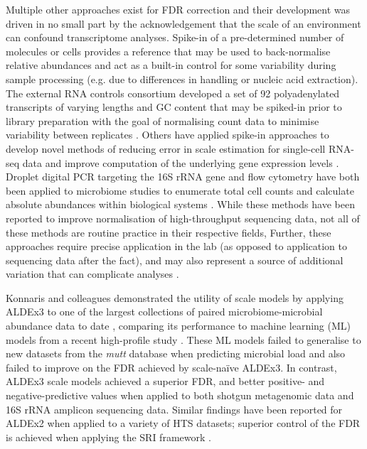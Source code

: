 \documentclass[10pt,letterpaper]{article}
\begin{document}
Multiple other approaches exist for FDR correction and their development was driven in no small part by the acknowledgement that the scale of an environment can confound transcriptome analyses. Spike-in of a pre-determined number of molecules or cells provides a reference that may be used to back-normalise relative abundances and act as a built-in control for some variability during sample processing \cite{rao_multi-kingdom_2021} (e.g. due to differences in handling or nucleic acid extraction). The external RNA controls consortium developed a set of 92 polyadenylated transcripts of varying lengths and GC content that may be spiked-in prior to library preparation with the goal of normalising count data to minimise variability between replicates \cite{baker_external_2005}. Others have applied spike-in approaches to develop novel methods of reducing error in scale estimation for single-cell RNA-seq data and improve computation of the underlying gene expression levels \cite{ding_normalization_2015}. Droplet digital PCR targeting the 16S rRNA gene and flow cytometry have both been applied to microbiome studies to enumerate total cell counts and calculate absolute abundances within biological systems \cite{lin_towards_2019, barlow_quantitative_2020}. While these methods have been reported to improve normalisation of high-throughput sequencing data, not all of these methods are routine practice in their respective fields, Further, these approaches require precise application in the lab (as opposed to application to sequencing data after the fact), and may also represent a source of additional variation that can complicate analyses \cite{risso_normalization_2014}.

Konnaris and colleagues demonstrated the utility of scale models by applying ALDEx3 to one of the largest collections of paired microbiome-microbial abundance data to date \cite{konnaris_uncertainty_2025}, comparing its performance to machine learning (ML) models from a recent high-profile study \cite{nishijima_fecal_2025}. These ML models failed to generalise to new datasets from the \textit{mutt} database \cite{konnaris_uncertainty_2025} when predicting microbial load and also failed to improve on the FDR achieved by scale-na\"ive ALDEx3. In contrast, ALDEx3 scale models achieved a superior FDR, and better positive- and negative-predictive values when applied to both shotgun metagenomic data and 16S rRNA amplicon sequencing data. Similar findings have been reported for ALDEx2 when applied to a variety of HTS datasets; superior control of the FDR is achieved when applying the SRI framework \cite{gloor_explicit_2025}.
\end{document}
